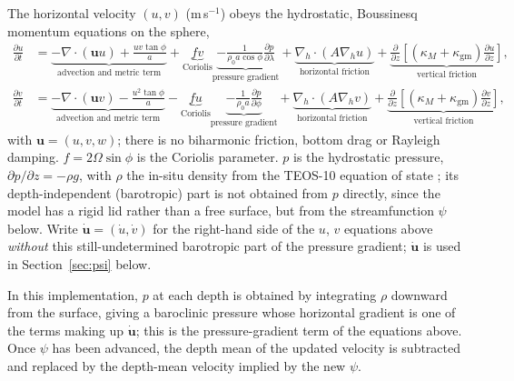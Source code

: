 \documentclass{article}
\begin{document}
The horizontal velocity $(u,v)$ (m\,s$^{-1}$) obeys the hydrostatic, Boussinesq momentum equations on the sphere,
\begin{align}
\frac{\partial u}{\partial t} &= \underbrace{-\nabla\cdot(\mathbf{u}u) + \frac{uv\tan\phi}{a}}_{\text{advection and metric term}} + \underbrace{fv}_{\text{Coriolis}} \underbrace{- \frac{1}{\rho_0 a\cos\phi}\frac{\partial p}{\partial\lambda}}_{\text{pressure gradient}} + \underbrace{\nabla_h\cdot(A\nabla_h u)}_{\text{horizontal friction}} + \underbrace{\frac{\partial}{\partial z}\!\left[(\kappa_M+\kappa_\text{gm})\frac{\partial u}{\partial z}\right]}_{\text{vertical friction}}, \label{eq:u}\\
\frac{\partial v}{\partial t} &= \underbrace{-\nabla\cdot(\mathbf{u}v) - \frac{u^2\tan\phi}{a}}_{\text{advection and metric term}} - \underbrace{fu}_{\text{Coriolis}} \underbrace{- \frac{1}{\rho_0 a}\frac{\partial p}{\partial\phi}}_{\text{pressure gradient}} + \underbrace{\nabla_h\cdot(A\nabla_h v)}_{\text{horizontal friction}} + \underbrace{\frac{\partial}{\partial z}\!\left[(\kappa_M+\kappa_\text{gm})\frac{\partial v}{\partial z}\right]}_{\text{vertical friction}}, \label{eq:v}
\end{align}
with $\mathbf{u}=(u,v,w)$; there is no biharmonic friction, bottom drag or Rayleigh damping.
$f = 2\Omega\sin\phi$ is the Coriolis parameter.
$p$ is the hydrostatic pressure, $\partial p/\partial z = -\rho g$, with $\rho$ the in-situ density from the TEOS-10 equation of state \citep{teos10}; its depth-independent (barotropic) part is not obtained from $p$ directly, since the model has a rigid lid rather than a free surface, but from the streamfunction $\psi$ below.
Write $\dot{\mathbf{u}} = (\dot u, \dot v)$ for the right-hand side of the $u$, $v$ equations above \emph{without} this still-undetermined barotropic part of the pressure gradient; $\dot{\mathbf{u}}$ is used in Section~\ref{sec:psi} below.

In this implementation, $p$ at each depth is obtained by integrating $\rho$ downward from the surface, giving a baroclinic pressure whose horizontal gradient is one of the terms making up $\dot{\mathbf{u}}$; this is the pressure-gradient term of the equations above. Once $\psi$ has been advanced, the depth mean of the updated velocity is subtracted and replaced by the depth-mean velocity implied by the new $\psi$.
\end{document}

